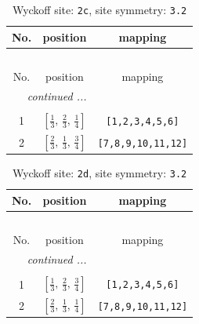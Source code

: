\documentclass[fleqn,8pt]{jsarticle}
\begin{document}
\renewcommand{\arraystretch}{1.2}
\begin{longtable}{ccc}
\caption{Wyckoff site: {\tt 2c}, site symmetry: {\tt 3.2}}
 \\
 \hline \hline
No. & position & mapping \\ \hline \endfirsthead

\multicolumn{2}{l}{\tablename\ \thetable{}} \\
 \hline \hline
No. & position & mapping \\ \hline \endhead

 \hline \hline
\multicolumn{2}{r}{\footnotesize\it continued ...} \\ \endfoot

 \hline \hline
\multicolumn{2}{r}{} \\ \endlastfoot

1 & $\left[ \frac{1}{3},\, \frac{2}{3},\, \frac{1}{4} \right]$ & {\tt [1,2,3,4,5,6]} \\ \hline
2 & $\left[ \frac{2}{3},\, \frac{1}{3},\, \frac{3}{4} \right]$ & {\tt [7,8,9,10,11,12]} \\
\end{longtable}
\renewcommand{\arraystretch}{1.2}
\begin{longtable}{ccc}
\caption{Wyckoff site: {\tt 2d}, site symmetry: {\tt 3.2}}
 \\
 \hline \hline
No. & position & mapping \\ \hline \endfirsthead

\multicolumn{2}{l}{\tablename\ \thetable{}} \\
 \hline \hline
No. & position & mapping \\ \hline \endhead

 \hline \hline
\multicolumn{2}{r}{\footnotesize\it continued ...} \\ \endfoot

 \hline \hline
\multicolumn{2}{r}{} \\ \endlastfoot

1 & $\left[ \frac{1}{3},\, \frac{2}{3},\, \frac{3}{4} \right]$ & {\tt [1,2,3,4,5,6]} \\ \hline
2 & $\left[ \frac{2}{3},\, \frac{1}{3},\, \frac{1}{4} \right]$ & {\tt [7,8,9,10,11,12]} \\
\end{longtable}
\renewcommand{\arraystretch}{1.2}
\end{document}
